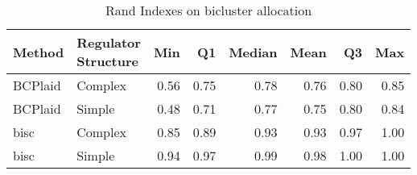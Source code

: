 \begin{table}[ht]
\caption{Rand Indexes on bicluster allocation}
\vspace{1.5cm}
\centering
\begin{tabular}{llrrrrrr}
  \toprule
Method & \makecell{Regulator \\ Structure} & Min & Q1 & Median & Mean & Q3 & Max \\ 
  \midrule
BCPlaid & Complex & 0.56 & 0.75 & 0.78 & 0.76 & 0.80 & 0.85 \\ 
  BCPlaid & Simple & 0.48 & 0.71 & 0.77 & 0.75 & 0.80 & 0.84 \\ 
  bisc & Complex & 0.85 & 0.89 & 0.93 & 0.93 & 0.97 & 1.00 \\ 
  bisc & Simple & 0.94 & 0.97 & 0.99 & 0.98 & 1.00 & 1.00 \\ 
   \bottomrule
\end{tabular}
\end{table}
